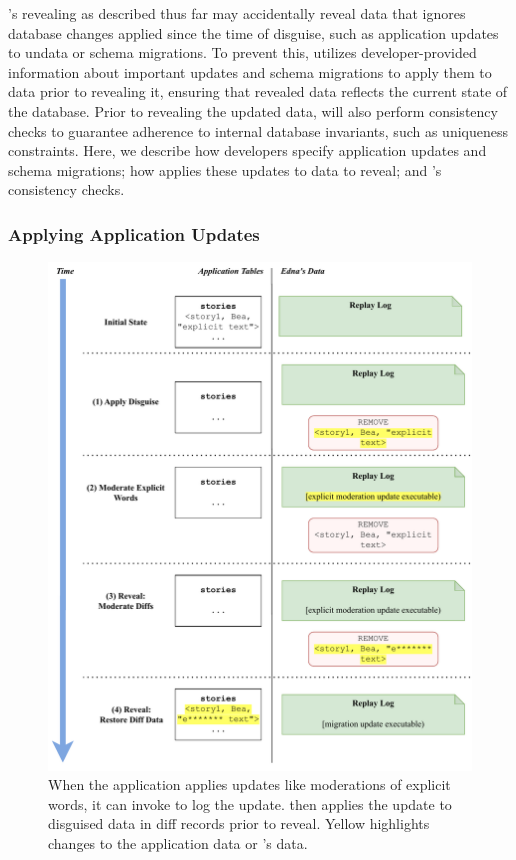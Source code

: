 \sys's revealing as described thus far may accidentally reveal data that ignores
database changes applied since the time of disguise, such as application updates
to un\xxed data or schema migrations.
%
To prevent this, \sys utilizes developer-provided information about important
updates and schema migrations to apply them to \xxed data prior to revealing it,
ensuring that revealed data reflects the current state of the database.
%
Prior to revealing the updated data, \sys will also perform consistency checks
to guarantee adherence to internal database invariants, such as uniqueness
constraints.
%
Here, we describe how developers specify application updates and schema
migrations; how \sys applies these updates to data to reveal; and \sys's
consistency checks.

%
\subsubsection{Applying Application Updates}

\begin{figure}
    \centering
    \includegraphics[width=\textwidth]{figs/update-moderation}
    \caption{When the application applies updates like moderations of explicit
    words, it can invoke \sys to log the update. \sys then applies the
    update to disguised data in diff records prior to reveal. Yellow 
    highlights changes to the application data or \sys's data.}
\label{f:update:mod}
\end{figure}

